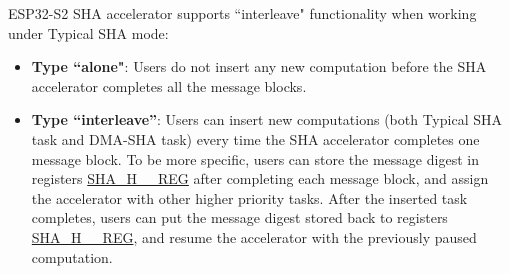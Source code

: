 \documentclass[main\_\_EN.tex]{subfiles}
\begin{document}
ESP32-S2 SHA accelerator supports ``interleave" functionality when working under Typical SHA mode:

\begin{itemize}
    \item \textbf{Type ``alone"}: Users do not insert any new computation before the SHA accelerator completes all the message blocks.
    \item \textbf{Type ``interleave”}: Users can insert new computations (both Typical SHA task and DMA-SHA task) every time the SHA accelerator completes one message block. To be more specific, users can store the message digest in registers \hyperref[regdesc:SHAHNREG]{SHA\_H\_\_REG} after completing each message block, and assign the accelerator with other higher priority tasks. After the inserted task completes, users can put the message digest stored back to registers \hyperref[regdesc:SHAHNREG]{SHA\_H\_\_REG}, and resume the accelerator with the previously paused computation.
\end{itemize}
\end{document}
